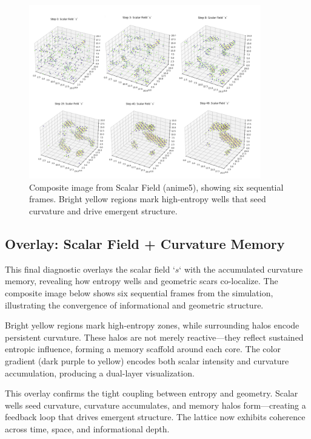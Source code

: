 \documentclass[12pt]{article}
\begin{document}
\begin{figure}[h]
    \centering
    \includegraphics[width=0.9\textwidth]{Figures/Figure_10.png}
    \caption{Composite image from Scalar Field (anime5), showing six sequential frames. Bright yellow regions mark high-entropy wells that seed curvature and drive emergent structure.}
    \label{fig:scalar_field}
\end{figure}

\subsection{Overlay: Scalar Field + Curvature Memory}

This final diagnostic overlays the scalar field `\( s \)` with the accumulated curvature memory, revealing how entropy wells and geometric scars co-localize. The composite image below shows six sequential frames from the simulation, illustrating the convergence of informational and geometric structure.

Bright yellow regions mark high-entropy zones, while surrounding halos encode persistent curvature. These halos are not merely reactive—they reflect sustained entropic influence, forming a memory scaffold around each core. The color gradient (dark purple to yellow) encodes both scalar intensity and curvature accumulation, producing a dual-layer visualization.

This overlay confirms the tight coupling between entropy and geometry. Scalar wells seed curvature, curvature accumulates, and memory halos form—creating a feedback loop that drives emergent structure. The lattice now exhibits coherence across time, space, and informational depth.
\end{document}
